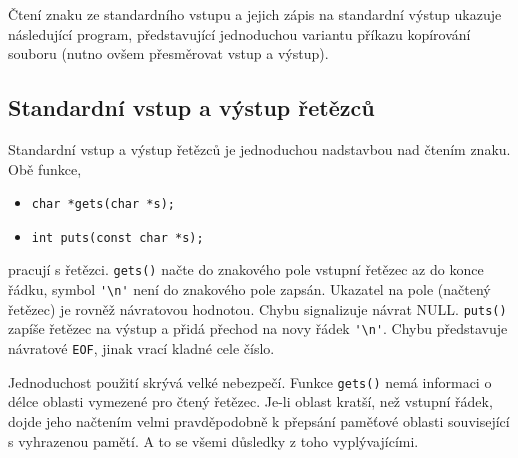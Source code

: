 {        %
         
      
      \begin{example}Čtení znaku ze standardního vstupu a jejich zápis na standardní výstup 
        ukazuje následující program, představující jednoduchou variantu příkazu kopírování souboru 
        (nutno ovšem přesměrovat vstup a výstup).
  
        
      \end{example}
      
    \subsection{Standardní vstup a výstup řetězců}
      Standardní vstup a výstup řetězců je jednoduchou nadstavbou nad čtením znaku. Obě funkce,
      \begin{itemize}
        \item \lstinline[basicstyle=\ttfamily]!char *gets(char *s);!
        \item \lstinline[basicstyle=\ttfamily]!int puts(const char *s);!
      \end{itemize}
      pracují s řetězci. \texttt{gets()} načte do znakového pole vstupní řetězec az do konce řádku, 
      symbol  \lstinline[basicstyle=\ttfamily]!'\n'! není do znakového pole zapsán. Ukazatel na 
      pole (načtený řetězec) je rovněž návratovou hodnotou. Chybu signalizuje návrat NULL. 
      \texttt{puts()} 
      zapíše řetězec na výstup a přidá přechod na novy řádek       
      \lstinline[basicstyle=\ttfamily]!'\n'!. Chybu představuje návratové \texttt{EOF}, jinak vrací 
      kladné cele číslo.
  
      Jednoduchost použití skrývá velké nebezpečí. Funkce \texttt{gets()} nemá informaci o délce 
      oblasti vymezené pro čtený řetězec. Je-li oblast kratší, než vstupní řádek, dojde jeho 
      načtením velmi pravděpodobně k přepsání paměťové oblasti související s vyhrazenou pamětí. A 
      to se všemi důsledky z toho vyplývajícími.
  
}

